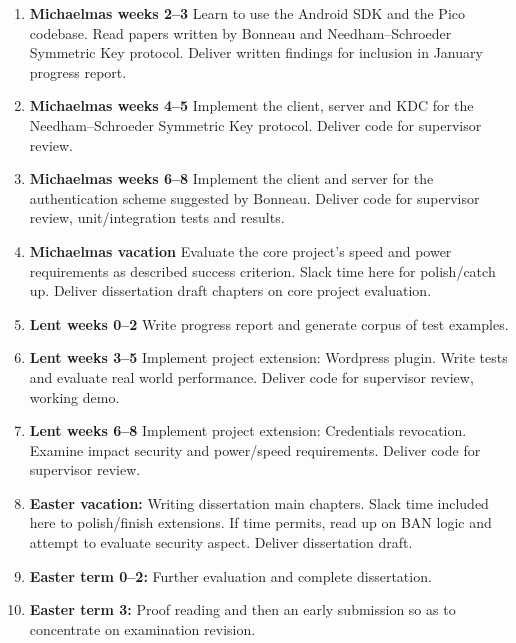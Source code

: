 \documentclass[12pt,a4paper,twoside]{article}
\begin{document}
\begin{enumerate}

\item {\bf Michaelmas weeks 2--3} Learn to use the Android SDK and the Pico codebase. Read papers written by Bonneau and Needham–Schroeder Symmetric Key protocol. Deliver written findings for inclusion in January progress report. 

\item {\bf Michaelmas weeks 4--5} Implement the client, server and KDC for the Needham–Schroeder Symmetric Key protocol. Deliver code for supervisor review.

\item {\bf Michaelmas weeks 6--8} Implement the client and server for the authentication scheme suggested by Bonneau. Deliver code for supervisor review, unit/integration tests and results.

\item {\bf Michaelmas vacation} Evaluate the core project’s speed and power requirements as described success criterion. Slack time here for polish/catch up. Deliver dissertation draft chapters on core project evaluation.

\item {\bf Lent weeks 0--2} Write progress report and generate corpus of test examples.

\item {\bf Lent weeks 3--5} Implement project extension: Wordpress plugin. Write tests and evaluate real world performance. Deliver code for supervisor review, working demo.

\item {\bf Lent weeks 6--8} Implement project extension: Credentials revocation. Examine impact security and power/speed requirements. Deliver code for supervisor review.

\item {\bf Easter vacation:} Writing dissertation main chapters. Slack time included here to polish/finish extensions. If time permits, read up on BAN logic and attempt to evaluate security aspect. Deliver dissertation draft.

\item {\bf Easter term 0--2:}  Further evaluation and complete dissertation.

\item {\bf Easter term 3:} Proof reading and then an early submission so as to concentrate on examination revision.

\end{enumerate}
\end{document}
